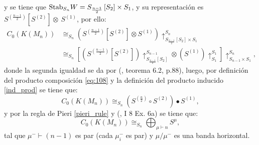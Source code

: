 \documentclass[12pt]{book}
\theoremstyle{definition}
\newcounter{in}
\newcounter{ini}
\begin{document}
y se tiene que $\textup{Stab}_{S_{n}} W = S_{\frac{n-1}{2}} \left [ S_{2} \right ] \times S_{1}$, y su representación es $S^{(\frac{n-1}{2})} \left [ S^{(2)} \right ] \otimes~S^{(1)}$, por ello:
\begin{equation}
\begin{aligned}
C_{0}(K(M_{n})) & \cong_{S_{n}} (S^{(\frac{n-1}{2})} \left [ S^{(2)} \right ] \otimes S^{(1)})\uparrow_{S_{\frac{n-1}{2}} \left [ S_{2} \right ] \times S_{1}}^{S_{n}} \\
& \cong_{S_{n}} \left [ (S^{(\frac{n-1}{2})} \left [ S^{(2)} \right ])\uparrow_{S_{\frac{n-1}{2}} \left [ S_{2} \right ]}^{S_{n-1}} \otimes (S^{(1)})\uparrow_{S_{1}}^{S_{1}} \right ] \uparrow_{S_{n-1} \times S_{1}}^{S_{n}},
\end{aligned}
\end{equation} 
donde la segunda igualdad se da por \normalfont(\cite{karpilovsky1990induced}, teorema 6.2, p.88), luego, por definición del producto composición \ref{eq:108} y la definición del producto inducido \ref{ind_prod} se tiene que:
\begin{equation}
C_{0}(K(M_{n})) \cong_{S_{n}} (S^{(\frac{n}{2})} \circ S^{(2)} ) \bullet S^{(1)},
\end{equation} 
y por la regla de Pieri \ref{pieri_rule} y \normalfont(\cite{macdonald1998symmetric}, I 8 Ex. 6a) se tiene que:
\begin{equation}
  \label{eq:112_1}
   C_{0}(K(M_n)) \cong_{S_{n}} \bigoplus_{\mu \vdash n} S^{\mu},
\end{equation}
tal que $\mu^{-} \vdash (n-1)$ es par (cada $\mu_{i}^{-}$ es par) y $\mu / \mu^{-}$ es una banda horizontal.
\end{document}
